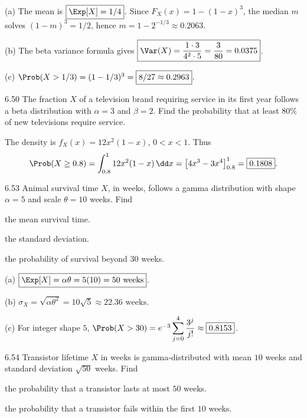 \documentclass[11pt,oneside]{article}
\begin{document}
\begin{solution}
\noindent\textup{(a)} The mean is $\boxed{\Exp[X]=1/4}$. Since $F_X(x)=1-(1-x)^3$, the median $m$ solves $(1-m)^3=1/2$, hence $\boxed{m=1-2^{-1/3}\approx0.2063}$.

\noindent\textup{(b)} The beta variance formula gives $\boxed{\Var(X)=\frac{1\cdot3}{4^2\cdot5}=\frac3{80}=0.0375}$.

\noindent\textup{(c)} $\Prob(X>1/3)=(1-1/3)^3=\boxed{8/27\approx0.2963}$.
\end{solution}

\begin{exercise}{6.50}
The fraction $X$ of a television brand requiring service in its first year follows a beta distribution with $\alpha=3$ and $\beta=2$. Find the probability that at least $80\%$ of new televisions require service.
\end{exercise}

\begin{solution}
The density is $f_X(x)=12x^2(1-x)$, $0<x<1$. Thus
\[
\Prob(X\ge0.8)=\int_{0.8}^1 12x^2(1-x)\,\dd x
=\bigl[4x^3-3x^4\bigr]_{0.8}^1
=\boxed{0.1808}.
\]
\end{solution}

\begin{exercise}{6.53}
Animal survival time $X$, in weeks, follows a gamma distribution with shape $\alpha=5$ and scale $\theta=10$ weeks. Find
\begin{exercisesubparts}
\item the mean survival time.
\item the standard deviation.
\item the probability of survival beyond $30$ weeks.
\end{exercisesubparts}
\end{exercise}

\begin{solution}
\noindent\textup{(a)} $\boxed{\Exp[X]=\alpha\theta=5(10)=50\text{ weeks}}$.

\noindent\textup{(b)} $\boxed{\sigma_X=\sqrt{\alpha\theta^2}=10\sqrt5\approx22.36\text{ weeks}}$.

\noindent\textup{(c)} For integer shape $5$, $\Prob(X>30)=e^{-3}\displaystyle\sum_{j=0}^4\frac{3^j}{j!}\approx\boxed{0.8153}$.
\end{solution}

\begin{exercise}{6.54}
Transistor lifetime $X$ in weeks is gamma-distributed with mean $10$ weeks and standard deviation $\sqrt{50}$ weeks. Find
\begin{exercisesubparts}
\item the probability that a transistor lasts at most $50$ weeks.
\item the probability that a transistor fails within the first $10$ weeks.
\end{exercisesubparts}
\end{exercise}
\end{document}

